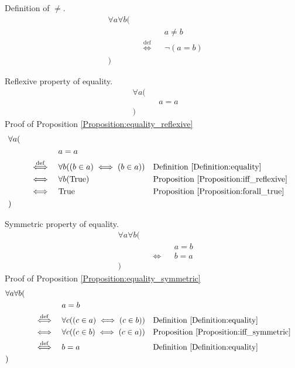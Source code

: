 \begin{defn}
\label{Definition:neq}
Definition of $\neq$.
\begin{align*}
& \forall a \forall b ( \\
& \quad && && a \neq b \\
& \quad && \overset{\operatorname{def}}{\iff} && \lnot (a = b) \\
& )
\end{align*}
\end{defn}

\begin{prop}
\label{Proposition:equality_reflexive}
Reflexive property of equality.
\begin{align*}
& \forall a ( \\
& \quad && a = a \\
& )
\end{align*}
Proof of Proposition \ref{Proposition:equality_reflexive}
\begin{align*}
& \forall a ( \\
& \quad && && a = a \\
& \quad && \overset{\operatorname{def}}{\iff} && \forall b ((b \in a) \iff (b \in a))
&& \text{Definition \ref{Definition:equality}} \\
& \quad && \iff && \forall b (\text{True})
&& \text{Proposition \ref{Proposition:iff_reflexive}} \\
& \quad && \iff && \text{True}
&& \text{Proposition \ref{Proposition:forall_true}} \\
& )
\end{align*}
\end{prop}

\begin{prop}
\label{Proposition:equality_symmetric}
Symmetric property of equality.
\begin{align*}
& \forall a \forall b ( \\
& \quad && && a = b \\
& \quad && \iff && b = a \\
& )
\end{align*}
Proof of Proposition \ref{Proposition:equality_symmetric}
\begin{align*}
& \forall a \forall b ( \\
& \quad && && a = b \\
& \quad && \overset{\operatorname{def}}{\iff} && \forall c ((c \in a) \iff (c \in b))
&& \text{Definition \ref{Definition:equality}} \\
& \quad && \iff && \forall c ((c \in b) \iff (c \in a))
&& \text{Proposition \ref{Proposition:iff_symmetric}} \\
& \quad && \overset{\operatorname{def}}{\iff} && b = a
&& \text{Definition \ref{Definition:equality}} \\
& )
\end{align*}
\end{prop}


